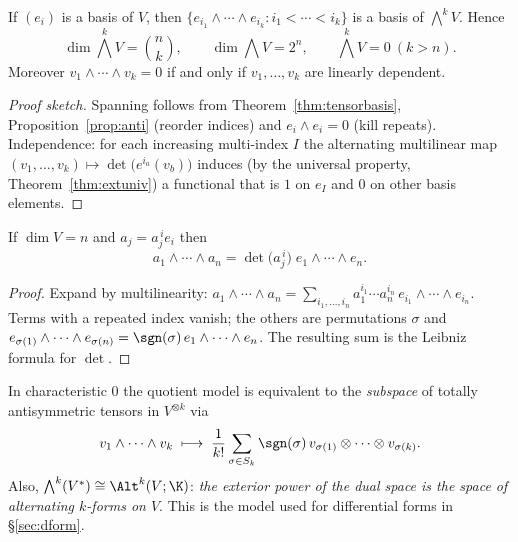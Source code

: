 \begin{theorem}\label{thm:extbasis}
If $(e_i)$ is a basis of $V$, then $\{e_{i_1}\wedge\cdots\wedge e_{i_k}: i_1<\cdots<i_k\}$ is a basis of $\bigwedge^kV$. Hence
\[
 \dim\textstyle\bigwedge^kV=\binom nk,\qquad\dim\bigwedge V=2^n,\qquad \bigwedge^kV=0\ (k>n).
\]
Moreover $v_1\wedge\cdots\wedge v_k=0$ if and only if $v_1,\dots,v_k$ are linearly dependent.
\end{theorem}
\begin{proof}[Proof sketch]
Spanning follows from Theorem~\ref{thm:tensorbasis}, Proposition~\ref{prop:anti} (reorder indices) and $e_i\wedge e_i=0$ (kill repeats).
Independence: for each increasing multi-index $I$ the alternating multilinear map $(v_1,\dots,v_k)\mapsto\det\bigl(e^{i_a}(v_b)\bigr)$ induces (by
the universal property, Theorem~\ref{thm:extuniv}) a functional that is $1$ on $e_I$ and $0$ on other basis elements.
\end{proof}

\begin{corollary}[Determinant]\label{cor:det}
If $\dim V=n$ and $a_j=a_j^{\,i}e_i$ then
\[
 a_1\wedge\cdots\wedge a_n=\det\bigl(a_j^{\,i}\bigr)\;e_1\wedge\cdots\wedge e_n .
\]
\end{corollary}
\begin{proof}
Expand by multilinearity: $a_1\wedge\cdots\wedge a_n=\sum_{i_1,\dots,i_n}a_1^{i_1}\cdots a_n^{i_n}\,e_{i_1}\wedge\cdots\wedge e_{i_n}$.
Terms with a repeated index vanish; the others are permutations $\sigma$ and $e_{\sigma(1)}\wedge\cdots\wedge e_{\sigma(n)}=\sgn(\sigma)\,e_1\wedge\cdots\wedge e_n$. The resulting sum is the Leibniz formula for $\det$.
\end{proof}

\begin{remark}\label{rem:twomodels}
In characteristic $0$ the quotient model is equivalent to the \emph{subspace} of totally antisymmetric tensors in $V^{\otimes k}$ via
\[
 v_1\wedge\cdots\wedge v_k\;\longmapsto\;\frac1{k!}\sum_{\sigma\in S_k}\sgn(\sigma)\,v_{\sigma(1)}\otimes\cdots\otimes v_{\sigma(k)} .
\]
Also, $\bigwedge^k(V^*)\cong\Alt^k(V;\K)$: \emph{the exterior power of the dual space is the space of alternating $k$-forms on $V$}. This is the model used for differential forms in \S\ref{sec:dform}.
\end{remark}


